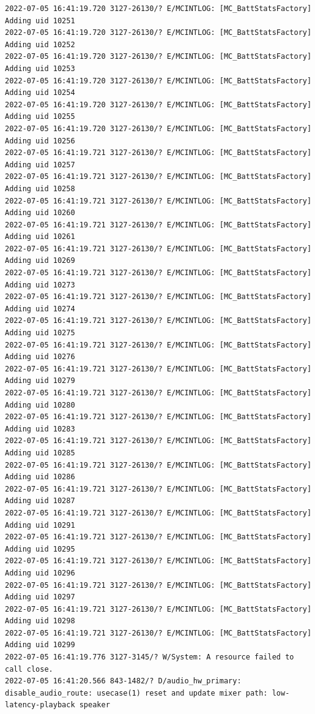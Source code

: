 \documentclass[a4paper,12pt]{book}
\begin{document}
\begin{lstlisting}
2022-07-05 16:41:19.720 3127-26130/? E/MCINTLOG: [MC_BattStatsFactory] Adding uid 10251
2022-07-05 16:41:19.720 3127-26130/? E/MCINTLOG: [MC_BattStatsFactory] Adding uid 10252
2022-07-05 16:41:19.720 3127-26130/? E/MCINTLOG: [MC_BattStatsFactory] Adding uid 10253
2022-07-05 16:41:19.720 3127-26130/? E/MCINTLOG: [MC_BattStatsFactory] Adding uid 10254
2022-07-05 16:41:19.720 3127-26130/? E/MCINTLOG: [MC_BattStatsFactory] Adding uid 10255
2022-07-05 16:41:19.720 3127-26130/? E/MCINTLOG: [MC_BattStatsFactory] Adding uid 10256
2022-07-05 16:41:19.721 3127-26130/? E/MCINTLOG: [MC_BattStatsFactory] Adding uid 10257
2022-07-05 16:41:19.721 3127-26130/? E/MCINTLOG: [MC_BattStatsFactory] Adding uid 10258
2022-07-05 16:41:19.721 3127-26130/? E/MCINTLOG: [MC_BattStatsFactory] Adding uid 10260
2022-07-05 16:41:19.721 3127-26130/? E/MCINTLOG: [MC_BattStatsFactory] Adding uid 10261
2022-07-05 16:41:19.721 3127-26130/? E/MCINTLOG: [MC_BattStatsFactory] Adding uid 10269
2022-07-05 16:41:19.721 3127-26130/? E/MCINTLOG: [MC_BattStatsFactory] Adding uid 10273
2022-07-05 16:41:19.721 3127-26130/? E/MCINTLOG: [MC_BattStatsFactory] Adding uid 10274
2022-07-05 16:41:19.721 3127-26130/? E/MCINTLOG: [MC_BattStatsFactory] Adding uid 10275
2022-07-05 16:41:19.721 3127-26130/? E/MCINTLOG: [MC_BattStatsFactory] Adding uid 10276
2022-07-05 16:41:19.721 3127-26130/? E/MCINTLOG: [MC_BattStatsFactory] Adding uid 10279
2022-07-05 16:41:19.721 3127-26130/? E/MCINTLOG: [MC_BattStatsFactory] Adding uid 10280
2022-07-05 16:41:19.721 3127-26130/? E/MCINTLOG: [MC_BattStatsFactory] Adding uid 10283
2022-07-05 16:41:19.721 3127-26130/? E/MCINTLOG: [MC_BattStatsFactory] Adding uid 10285
2022-07-05 16:41:19.721 3127-26130/? E/MCINTLOG: [MC_BattStatsFactory] Adding uid 10286
2022-07-05 16:41:19.721 3127-26130/? E/MCINTLOG: [MC_BattStatsFactory] Adding uid 10287
2022-07-05 16:41:19.721 3127-26130/? E/MCINTLOG: [MC_BattStatsFactory] Adding uid 10291
2022-07-05 16:41:19.721 3127-26130/? E/MCINTLOG: [MC_BattStatsFactory] Adding uid 10295
2022-07-05 16:41:19.721 3127-26130/? E/MCINTLOG: [MC_BattStatsFactory] Adding uid 10296
2022-07-05 16:41:19.721 3127-26130/? E/MCINTLOG: [MC_BattStatsFactory] Adding uid 10297
2022-07-05 16:41:19.721 3127-26130/? E/MCINTLOG: [MC_BattStatsFactory] Adding uid 10298
2022-07-05 16:41:19.721 3127-26130/? E/MCINTLOG: [MC_BattStatsFactory] Adding uid 10299
2022-07-05 16:41:19.776 3127-3145/? W/System: A resource failed to call close. 
2022-07-05 16:41:20.566 843-1482/? D/audio_hw_primary: disable_audio_route: usecase(1) reset and update mixer path: low-latency-playback speaker

\end{lstlisting}
\end{document}
